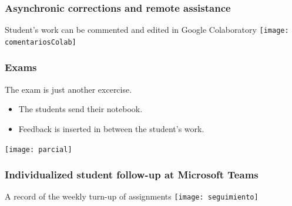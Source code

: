 \documentclass[aspectratio=169]{beamer}
\begin{document}
\begin{frame}
	\frametitle{Asynchronic corrections and remote assistance}
	\begin{block}{Student's work can be commented and edited in Google Colaboratory}
		\texttt{[image: comentariosColab]}
	\end{block}
\end{frame}

\begin{frame}
	\frametitle{Exams}
	\begin{block}{The exam is just another excercise.}
		\begin{itemize}
			\item The students send their notebook.
			\item Feedback is inserted in between the student's work.
		\end{itemize}
		\texttt{[image: parcial]}
	\end{block}
\end{frame}



\begin{frame}
	\frametitle{Individualized student follow-up at Microsoft Teams}
	\begin{block}{A record of the weekly turn-up of assignments}
		\texttt{[image: seguimiento]}
	\end{block}
\end{frame}
\end{document}
